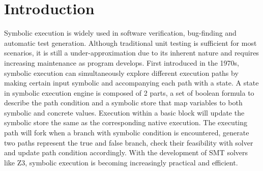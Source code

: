\documentclass[sigplan, nonacm]{acmart}\settopmatter{printfolios=true,printccs=false,printacmref=false}
\begin{document}
\section{Introduction}
Symbolic execution is widely used in software verification, bug-finding and automatic test generation. Although traditional unit testing is sufficient for most scenarios, it is still a under-approximation due to its inherent nature and requires increasing maintenance as program develops. First introduced in the 1970s\cite{boyer1975select, howden1977symbolic, king1975new, king1976symbolic}, symbolic execution can simultaneously explore different execution paths by making certain input symbolic and accompanying each path with a state. A state in symbolic execution engine is composed of 2 parts, a set of boolean formula to describe the path condition and a symbolic store that map variables to both symbolic and concrete values. Execution within a basic block will update the symbolic store the same as   the corresponding native execution. The executing path will fork when a branch with symbolic condition is encountered, generate two paths represent the true and false branch, check their feasibility with solver and update path condition accordingly. With the development of SMT\cite{barrett2021satisfiability} solvers like Z3\cite{moura2008z3}, symbolic execution is becoming increasingly practical and efficient.\par
\end{document}

